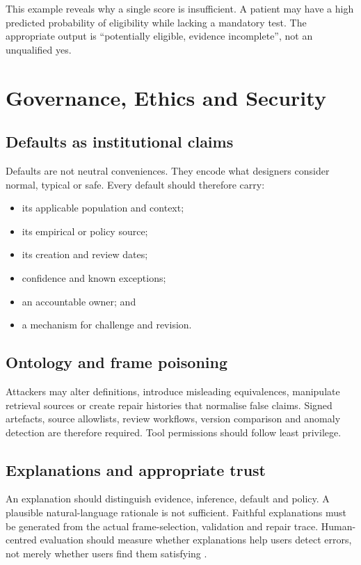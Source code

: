 \documentclass[11pt,a4paper]{article}
\begin{document}
This example reveals why a single score is insufficient. A patient may have a
high predicted probability of eligibility while lacking a mandatory test. The
appropriate output is ``potentially eligible, evidence incomplete'', not an
unqualified yes.

\section{Governance, Ethics and Security}

\subsection{Defaults as institutional claims}

Defaults are not neutral conveniences. They encode what designers consider
normal, typical or safe. Every default should therefore carry:

\begin{itemize}
  \item its applicable population and context;
  \item its empirical or policy source;
  \item its creation and review dates;
  \item confidence and known exceptions;
  \item an accountable owner; and
  \item a mechanism for challenge and revision.
\end{itemize}

\subsection{Ontology and frame poisoning}

Attackers may alter definitions, introduce misleading equivalences, manipulate
retrieval sources or create repair histories that normalise false claims. Signed
artefacts, source allowlists, review workflows, version comparison and anomaly
detection are therefore required. Tool permissions should follow least privilege.

\subsection{Explanations and appropriate trust}

An explanation should distinguish evidence, inference, default and policy. A
plausible natural-language rationale is not sufficient. Faithful explanations
must be generated from the actual frame-selection, validation and repair trace.
Human-centred evaluation should measure whether explanations help users detect
errors, not merely whether users find them satisfying
\citep{ribeiro2016lime,amershi2019guidelines}.
\end{document}
